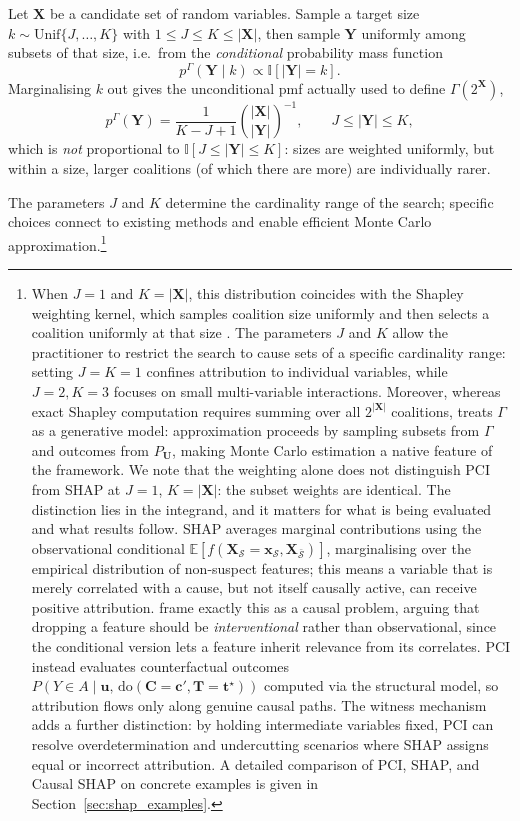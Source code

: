 \begin{example}
Let $\mathbf{X}$ be a candidate set of random variables. Sample a target size
$k \sim \mathrm{Unif}\{J, \dots, K\}$ with $1 \leq J \leq K \leq |\mathbf{X}|$, then
sample $\mathbf{Y}$ uniformly among subsets of that size, i.e.\ from the
\emph{conditional} probability mass function
\[
p^\Gamma(\mathbf{Y} \mid k) \propto \mathbb{I}[|\mathbf{Y}| = k].
\]
Marginalising $k$ out gives the unconditional pmf actually used to define
$\Gamma(2^\mathbf{X})$,
\[
p^\Gamma(\mathbf{Y}) = \frac{1}{K-J+1}\binom{|\mathbf{X}|}{|\mathbf{Y}|}^{-1},
\qquad J \leq |\mathbf{Y}| \leq K,
\]
which is \emph{not} proportional to $\mathbb{I}[J\leq|\mathbf{Y}|\leq K]$: sizes are
weighted uniformly, but within a size, larger coalitions (of which there are more) are
individually rarer.

The parameters $J$ and $K$ determine the cardinality range of the search; specific
choices connect \ourapproach to existing methods and enable efficient Monte Carlo
approximation.\footnote{When $J=1$ and $K=|\mathbf{X}|$, this distribution coincides with the Shapley weighting kernel, which samples coalition size uniformly and then selects a coalition uniformly at that size \citep{shapley1953}. The parameters $J$ and $K$ allow the practitioner to restrict the search to cause sets of a specific cardinality range: setting $J=K=1$ confines attribution to individual variables, while $J=2, K=3$ focuses on small multi-variable interactions. Moreover, whereas exact Shapley computation requires summing over all $2^{|\mathbf{X}|}$ coalitions, \ourapproach treats $\Gamma$ as a generative model: approximation proceeds by sampling subsets from $\Gamma$ and outcomes from $P_{\mathbf{U}}$, making Monte Carlo estimation a native feature of the framework.
We note that the weighting alone does not distinguish PCI from SHAP at $J=1$,
$K=|\mathbf{X}|$: the subset weights are identical. The distinction lies in the
integrand, and it matters for what is being evaluated and what results follow. SHAP
averages marginal contributions using the observational conditional
$\mathbb{E}[f(\mathbf{X}_{\mathcal{S}} = \mathbf{x}_{\mathcal{S}}, \mathbf{X}_{\bar{\mathcal{S}}})]$, marginalising over
the empirical distribution of non-suspect features; this means a variable that is merely
correlated with a cause, but not itself causally active, can receive positive
attribution. \citet{janzing2020feature} frame exactly this as a causal problem,
arguing that dropping a feature should be \emph{interventional} rather than
observational, since the conditional version lets a feature inherit relevance from its
correlates. PCI instead evaluates counterfactual outcomes
$P(Y \in A \mid \mathbf{u},\, \mathrm{do}(\mathbf{C}=\mathbf{c}',
\mathbf{T}=\mathbf{t}^\star))$ computed via the structural model, so attribution flows
only along genuine causal paths. The witness mechanism adds a further distinction: by
holding intermediate variables fixed, PCI can resolve overdetermination and undercutting
scenarios where SHAP assigns equal or incorrect attribution. A detailed comparison of PCI,
SHAP, and Causal SHAP on concrete examples is given in
Section~\ref{sec:shap_examples}.}
\end{example}

